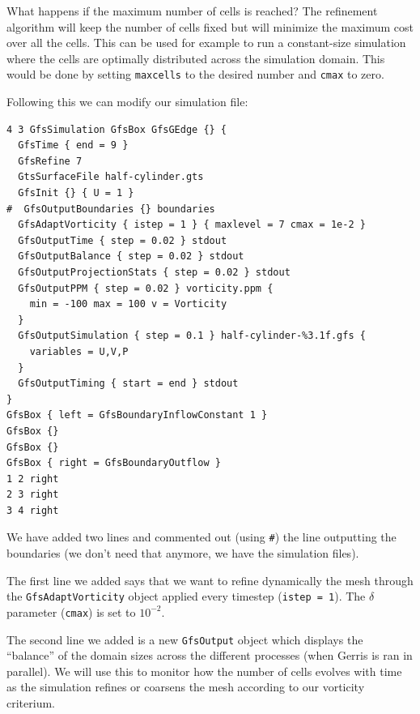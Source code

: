 \documentclass[a4paper]{article}
\begin{document}
What happens if the maximum number of cells is reached? The refinement algorithm will keep the number of cells fixed but will minimize the maximum cost over all the cells. This can be used for example to run a constant-size simulation where the cells are optimally distributed across the simulation domain. This would be done by setting {\tt maxcells} to the desired number and {\tt cmax} to zero.

Following this we can modify our simulation file:
\begin{verbatim}
4 3 GfsSimulation GfsBox GfsGEdge {} {
  GfsTime { end = 9 }
  GfsRefine 7
  GtsSurfaceFile half-cylinder.gts
  GfsInit {} { U = 1 }
#  GfsOutputBoundaries {} boundaries
  GfsAdaptVorticity { istep = 1 } { maxlevel = 7 cmax = 1e-2 }
  GfsOutputTime { step = 0.02 } stdout
  GfsOutputBalance { step = 0.02 } stdout
  GfsOutputProjectionStats { step = 0.02 } stdout
  GfsOutputPPM { step = 0.02 } vorticity.ppm {
    min = -100 max = 100 v = Vorticity
  }
  GfsOutputSimulation { step = 0.1 } half-cylinder-%3.1f.gfs {
    variables = U,V,P
  }
  GfsOutputTiming { start = end } stdout
}
GfsBox { left = GfsBoundaryInflowConstant 1 }
GfsBox {}
GfsBox {}
GfsBox { right = GfsBoundaryOutflow }
1 2 right
2 3 right
3 4 right
\end{verbatim}
We have added two lines and commented out (using {\tt \#}) the line
outputting the boundaries (we don't need that anymore, we have the
simulation files).

The first line we added says that we want to refine dynamically the
mesh through the {\tt GfsAdaptVorticity} object applied every timestep
({\tt istep = 1}). The $\delta$ parameter ({\tt cmax}) is set to $10^{-2}$.

The second line we added is a new {\tt GfsOutput} object which displays 
the ``balance'' of the domain sizes across the different processes
(when Gerris is ran in parallel). We will use this to monitor how the
number of cells evolves with time as the simulation refines or
coarsens the mesh according to our vorticity criterium.
\end{document}
